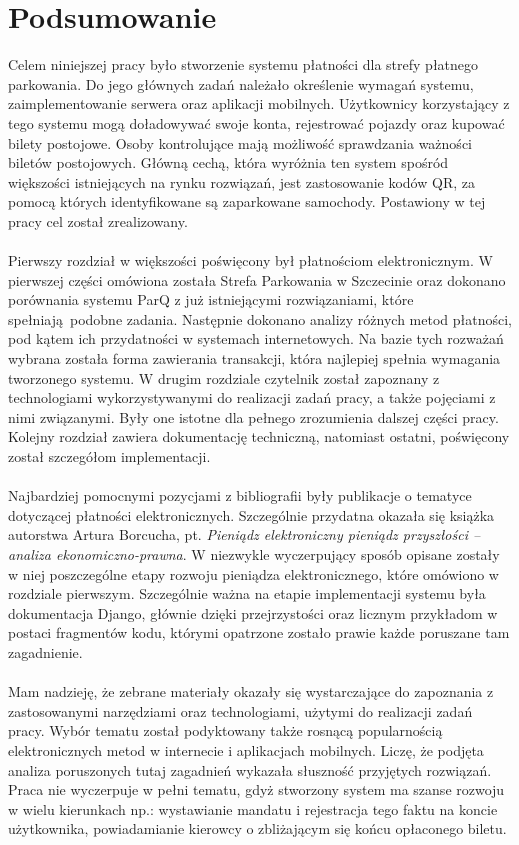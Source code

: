 \section*{Podsumowanie}

Celem niniejszej pracy było stworzenie systemu płatności dla strefy płatnego parkowania. Do jego głównych zadań należało określenie wymagań systemu, zaimplementowanie serwera oraz aplikacji mobilnych. Użytkownicy korzystający z tego systemu mogą doładowywać swoje konta, rejestrować pojazdy oraz kupować bilety postojowe. Osoby kontrolujące mają możliwość sprawdzania ważności biletów postojowych. Główną cechą, która wyróżnia ten system spośród większości istniejących na rynku rozwiązań, jest zastosowanie kodów QR, za pomocą których identyfikowane są zaparkowane samochody. Postawiony w tej pracy cel został zrealizowany.
\\
\\
Pierwszy rozdział w większości poświęcony był płatnościom elektronicznym. W pierwszej części omówiona została Strefa Parkowania w Szczecinie oraz dokonano porównania systemu ParQ z już istniejącymi rozwiązaniami, które spełniają podobne zadania. Następnie dokonano analizy różnych metod płatności, pod kątem ich przydatności w systemach internetowych. Na bazie tych rozważań wybrana została forma zawierania transakcji, która najlepiej spełnia wymagania tworzonego systemu. W drugim rozdziale czytelnik został zapoznany z technologiami wykorzystywanymi do realizacji zadań pracy, a także pojęciami z nimi związanymi. Były one istotne dla pełnego zrozumienia dalszej części pracy. Kolejny rozdział zawiera dokumentację techniczną, natomiast ostatni, poświęcony został szczegółom implementacji.
\\
\\
Najbardziej pomocnymi pozycjami z bibliografii były publikacje o tematyce dotyczącej płatności elektronicznych. Szczególnie przydatna okazała się książka autorstwa Artura Borcucha, pt. \textit{Pieniądz elektroniczny pieniądz przyszłości -- analiza ekonomiczno-prawna}. W niezwykle wyczerpujący sposób opisane zostały w niej poszczególne etapy rozwoju pieniądza elektronicznego, które omówiono w rozdziale pierwszym. Szczególnie ważna na etapie implementacji systemu była dokumentacja Django, głównie dzięki przejrzystości oraz licznym przykładom w postaci fragmentów kodu, którymi opatrzone zostało prawie każde poruszane tam zagadnienie.
\\
\\
Mam nadzieję, że zebrane materiały okazały się wystarczające do zapoznania z zastosowanymi narzędziami oraz technologiami, użytymi do realizacji zadań pracy. Wybór tematu został podyktowany także rosnącą popularnością elektronicznych metod w internecie i aplikacjach mobilnych. Liczę, że podjęta analiza poruszonych tutaj zagadnień wykazała słuszność przyjętych rozwiązań. Praca nie wyczerpuje w pełni tematu, gdyż stworzony system ma szanse rozwoju w wielu kierunkach np.: wystawianie mandatu i rejestracja tego faktu na koncie użytkownika, powiadamianie kierowcy o zbliżającym się końcu opłaconego biletu.